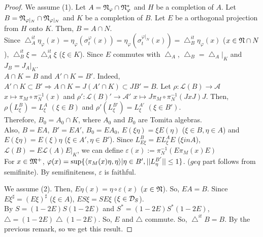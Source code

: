 \begin{proof}
  We assume (1).
  Let $A = \mathfrak{N}_\varphi \cap \mathfrak{N}_\varphi^*$ and $H$ be a completion of $A$.
  Let $B = \mathfrak{N}_{\varphi|_N} \cap \mathfrak{N}_{\varphi|_N}$ and $K$ be a completion of $B$.
  Let $E$ be a orthogonal projection from $H$ onto $K$. 
  Then, $B = A \cap N$.\\
  Since $\bigtriangleup_A^{it}\eta_\varphi(x) = \eta_\varphi(\sigma_t^\varphi(x)) = \eta_\varphi(\sigma_t^{\varphi|_N}(x)) = \bigtriangleup_B^{it}\eta_\varphi(x)$ ($x \in \mathfrak{N} \cap N$),
  $\bigtriangleup_B^{it}\xi = \bigtriangleup_{A}^{it}\xi$ ($\xi \in K$).
  Since $E$ commutes with $\bigtriangleup_A$, $\bigtriangleup_B = \bigtriangleup_A|_K$ and $J_B = J_A|_K$.\\
  $A \cap K = B$ and $A' \cap K = B'$.
  Indeed, $A' \cap K \subset B' \Rightarrow A \cap K = J(A' \cap K) \subset JB'=B$.
  Let $\rho : \mathcal{L}(B) \rightarrow \mathcal{A} $ $x \mapsto \pi_M \circ \pi_N^{-1}(x)$ and $\rho' : \mathcal{L}(B)' \rightarrow \mathcal{A}' $ $x \mapsto J\pi_M \circ \pi_N^{-1}(JxJ)J$.
  Then, $\rho (L^B_\xi) = L^A_\xi$ $(\xi \in B)$ and $\rho' (L^{B'}_\xi) = L^{A'}_\xi$ $(\xi \in B')$. \\
  Therefore, $B_0 = A_0 \cap K$, where $A_0$ and $B_0$ are Tomita algebras. \\
  Also, $B=EA$, $B'=EA'$, $B_0=EA_0$, $E(\xi\eta) = \xi E(\eta)$ ($\xi \in B, \eta \in A$) and $E(\xi\eta) = E(\xi)\eta$ ($\xi \in A', \eta \in B'$).
  Since $L^B_{E\xi}=EL^A_\xi E$ ($\xi in A$), $\mathcal{L}(B) = E\mathcal{L}(A)E|_K$,
  we can define $\varepsilon(x) := \pi_N^{-1}(E\pi_M(x)E)$\\
  For $x \in \mathfrak{M}^+$, $\varphi(x) = \sup \{\langle\pi_M(x)\eta, \eta\rangle| \eta \in B', ||L^{B'}_\eta|| \leq 1\}$. ($geq$ part follows from semifinite).
  By semifiniteness, $\varepsilon$ is faithful.

  We assume (2).
  Then, $E\eta(x) = \eta\circ\varepsilon(x)$ ($ x \in \mathfrak{N}$).
  So, $EA=B$.
  Since $E\xi^\sharp=(E\xi)^\sharp$ ($\xi \in A$), $ES\xi = SE\xi$ ($\xi \in \mathcal{D}_S$).\\
  By $S=(1-2E)S(1-2E)$ and $S^* = (1-2E)S^*(1-2E)$, $\bigtriangleup = (1-2E)\bigtriangleup(1-2E)$.
  So, $E$ and $\bigtriangleup$ commute.
  So, $\bigtriangleup^{it}B=B$.
  By the previous remark, so we get this result.
  

\end{proof}

  
